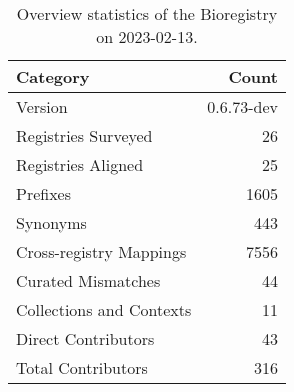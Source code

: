 \begin{table}
\centering
\caption{Overview statistics of the Bioregistry on 2023-02-13.}
\label{tab:bioregistry-summary}
\begin{tabular}{lr}
\toprule
                Category &      Count \\
\midrule
                 Version & 0.6.73-dev \\
     Registries Surveyed &         26 \\
      Registries Aligned &         25 \\
                Prefixes &       1605 \\
                Synonyms &        443 \\
 Cross-registry Mappings &       7556 \\
      Curated Mismatches &         44 \\
Collections and Contexts &         11 \\
     Direct Contributors &         43 \\
      Total Contributors &        316 \\
\bottomrule
\end{tabular}
\end{table}
